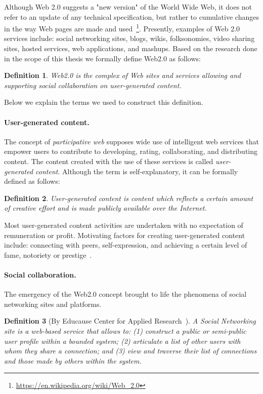 \documentclass[ngerman,UKenglish,table]{scrbook}
\newtheorem{definition}{Definition}
\begin{document}
Although Web 2.0 suggests a "new version" of the World Wide Web, it does not refer to an update of any technical specification, but rather to cumulative changes in the way Web pages are made and used~\footnote{\url{https://en.wikipedia.org/wiki/Web_2.0}}.
Presently, examples of Web 2.0 services include: social networking sites, blogs, wikis, folksonomies, video sharing sites, hosted services, web applications, and mashups.
Based on the research done in the scope of this thesis we formally define Web2.0 as follows:
\begin{definition}
Web2.0 is the complex of Web sites and services allowing and supporting social collaboration on user-generated content.
\end{definition}

Below we explain the terms we used to construct this definition.

\paragraph{User-generated content.} 
The concept of \emph{participative web} supposes wide use of intelligent web services that empower users to contribute to developing, rating, collaborating, and distributing content.
The content created with the use of these services is called \emph{user-generated content}. 
Although the term is self-explanatory, it can be formally defined as follows:
\begin{definition}User-generated content is content which reflects a certain amount of creative effort and is made publicly available over the Internet.
\end{definition}

Most user-generated content activities are undertaken with no expectation of
remuneration or profit.
Motivating factors for creating user-generated content include: connecting with peers, self-expression, and achieving a certain level of fame, notoriety or prestige~\cite{Vickery:2007:PWU:1554640}.
 
\paragraph{Social collaboration.}
The emergency of the Web2.0 concept brought to life the phenomena of social networking sites and platforms.

\begin{definition}[By Educause Center for Applied Research~\cite{educause}]
A Social Networking site is a web-based service that allows to: (1) construct a public or semi-public user profile within a bounded system; (2) articulate a list of other users with whom they share a connection; and (3) view and traverse their list of connections and those made by others within the system.
\end{definition}
\end{document}

